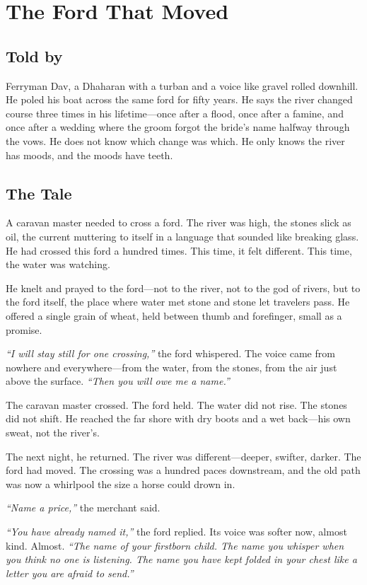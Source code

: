 \chapter{The Ford That Moved}

\section*{Told by}
Ferryman Dav, a Dhaharan with a turban and a voice like gravel rolled downhill. He poled his boat across the same ford for fifty years. He says the river changed course three times in his lifetime—once after a flood, once after a famine, and once after a wedding where the groom forgot the bride's name halfway through the vows. He does not know which change was which. He only knows the river has moods, and the moods have teeth.

\section*{The Tale}

A caravan master needed to cross a ford. The river was high, the stones slick as oil, the current muttering to itself in a language that sounded like breaking glass. He had crossed this ford a hundred times. This time, it felt different. This time, the water was watching.

He knelt and prayed to the ford—not to the river, not to the god of rivers, but to the ford itself, the place where water met stone and stone let travelers pass. He offered a single grain of wheat, held between thumb and forefinger, small as a promise.

\textit{``I will stay still for one crossing,''} the ford whispered. The voice came from nowhere and everywhere—from the water, from the stones, from the air just above the surface. \textit{``Then you will owe me a name.''}

The caravan master crossed. The ford held. The water did not rise. The stones did not shift. He reached the far shore with dry boots and a wet back—his own sweat, not the river's.

The next night, he returned. The river was different—deeper, swifter, darker. The ford had moved. The crossing was a hundred paces downstream, and the old path was now a whirlpool the size a horse could drown in.

\textit{``Name a price,''} the merchant said.

\textit{``You have already named it,''} the ford replied. Its voice was softer now, almost kind. Almost. \textit{``The name of your firstborn child. The name you whisper when you think no one is listening. The name you have kept folded in your chest like a letter you are afraid to send.''}

